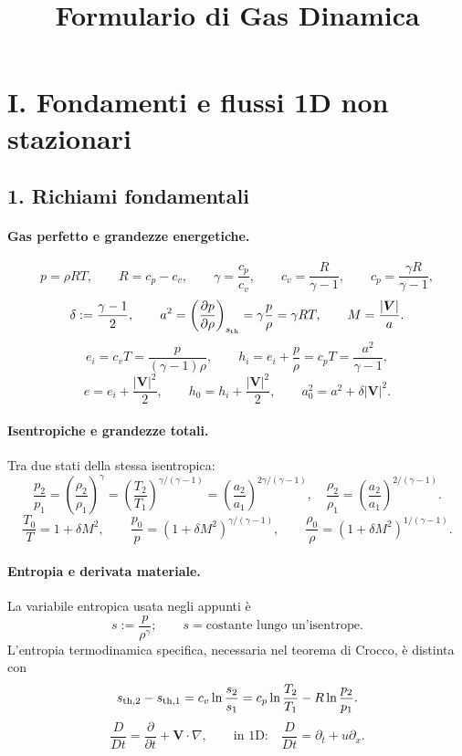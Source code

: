 \documentclass[11pt,a4paper]{article}
\title{Formulario di Gas Dinamica}
\author{}
\date{}
\begin{document}
\maketitle
\tableofcontents

\section*{I. Fondamenti e flussi 1D non stazionari}

\subsection*{1. Richiami fondamentali}

\paragraph*{Gas perfetto e grandezze energetiche.}
\[
p=\rho RT,\qquad R=c_p-c_v,\qquad \gamma=\frac{c_p}{c_v},\qquad
c_v=\frac{R}{\gamma-1},\qquad c_p=\frac{\gamma R}{\gamma-1},
\]
\[
\delta:=\frac{\gamma-1}{2},\qquad
a^2=\left(\frac{\partial p}{\partial\rho}\right)_{s_{\rm th}}
=\gamma\frac p\rho=\gamma RT,\qquad M=\frac{|\boldsymbol V|}{a}.
\]
\[
e_i=c_vT=\frac{p}{(\gamma-1)\rho},\qquad
h_i=e_i+\frac p\rho=c_pT=\frac{a^2}{\gamma-1},
\]
\[
e=e_i+\frac{|\boldsymbol V|^2}{2},\qquad
h_0=h_i+\frac{|\boldsymbol V|^2}{2},\qquad
a_0^2=a^2+\delta |\boldsymbol V|^2.
\]

\paragraph*{Isentropiche e grandezze totali.}
Tra due stati della stessa isentropica:
\[
\frac{p_2}{p_1}=\left(\frac{\rho_2}{\rho_1}\right)^\gamma
=\left(\frac{T_2}{T_1}\right)^{\gamma/(\gamma-1)}
=\left(\frac{a_2}{a_1}\right)^{2\gamma/(\gamma-1)},
\quad
\frac{\rho_2}{\rho_1}=\left(\frac{a_2}{a_1}\right)^{2/(\gamma-1)}.
\]
\[
\frac{T_0}{T}=1+\delta M^2,\qquad
\frac{p_0}{p}=(1+\delta M^2)^{\gamma/(\gamma-1)},\qquad
\frac{\rho_0}{\rho}=(1+\delta M^2)^{1/(\gamma-1)}.
\]

\paragraph*{Entropia e derivata materiale.}
La variabile entropica usata negli appunti è
\[
s:=\frac{p}{\rho^\gamma};\qquad s=\text{costante lungo un'isentrope}.
\]
L'entropia termodinamica specifica, necessaria nel teorema di Crocco, è distinta con
\[
s_{\rm th,2}-s_{\rm th,1}=c_v\ln\frac{s_2}{s_1}
=c_p\ln\frac{T_2}{T_1}-R\ln\frac{p_2}{p_1}.
\]
\[
\frac{D}{Dt}=\frac{\partial}{\partial t}+\boldsymbol V\cdot\nabla,
\qquad \text{in 1D:}\quad \frac{D}{Dt}=\partial_t+u\partial_x.
\]
\end{document}
